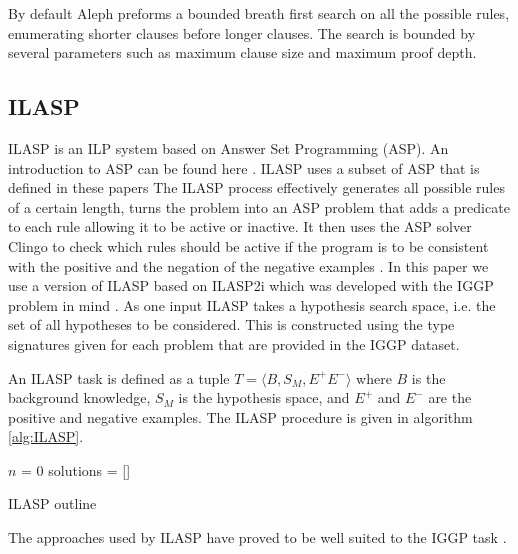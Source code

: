 By default Aleph preforms a bounded breath first search on all the possible rules, enumerating shorter clauses before longer clauses. The search is bounded by several parameters such as maximum clause size and maximum proof depth.

\subsection{ILASP}

ILASP is an ILP system based on Answer Set Programming (ASP). An introduction to ASP can be found here  \cite{Corapi/ASP}. ILASP uses a subset of ASP that is defined in these papers  \cite{ILASP-Manuel,MarkLaw/OG-ILASP,MarkLaw/Thesis} The ILASP process effectively generates all possible rules of a certain length, turns the problem into an ASP problem that adds a predicate to each rule allowing it to be active or inactive. It then uses the ASP solver Clingo \cite{Clingo}  to check which rules should be active if the program is to be consistent with the positive and the negation of the negative examples  \cite{MarkLaw/OG-ILASP,MarkLaw/Thesis}. In this paper we use a version of ILASP based on ILASP2i  \cite{MarkLaw/ILASP2i} which was developed with the IGGP problem in mind \cite{Cropper/IGGP}. As one input ILASP takes a hypothesis search space, i.e. the set of all hypotheses to be considered. This is constructed using the type signatures given for each problem that are provided in the IGGP dataset.

An ILASP task is defined as a tuple $T = \langle B,S_M,E^+E^-\rangle$ where $B$ is the background knowledge, $S_M$ is the hypothesis space, and $E^+$ and $E^-$ are the positive and negative examples. The ILASP procedure is given in algorithm \ref{alg:ILASP}.
\begin{algorithm}[H]\label{alg:ILASP}
    \SetAlgoLined
    $n$ = 0\;
    solutions = []\;
    \caption{ILASP outline}
\end{algorithm}

The approaches used by ILASP have proved to be well suited to the IGGP task  \cite{Cropper/IGGP}.
